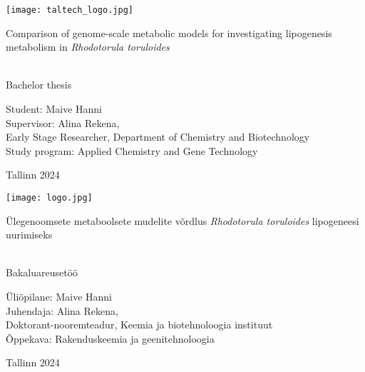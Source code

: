 \documentclass[a4paper, 11pt]{report}
\begin{document}
\begin{titlepage}
    \texttt{[image: taltech\_logo.jpg]}

    \begin{center}
        \vspace{35mm}
        \begin{LARGE}
            Comparison of genome-scale metabolic models for investigating 
            lipogenesis metabolism in \textit{Rhodotorula toruloides}
        \end{LARGE} \\
             Bachelor thesis

        \vspace{30mm}
        \hfill
        \parbox{50mm}{
            \flushleft
            Student: Maive Hanni \\
            Supervisor: Alina Rekena, \\
            Early Stage Researcher,  %
            Department of Chemistry and Biotechnology \\ %
            Study program: Applied Chemistry and Gene Technology
            }

            


        \vfill
        Tallinn 2024
    \end{center}
\end{titlepage}

\begin{titlepage}
    \texttt{[image: logo.jpg]}

    \begin{center}
        \vspace{35mm}
        \begin{LARGE}
            Ülegenoomsete metaboolsete mudelite võrdlus \textit{Rhodotorula toruloides} lipogeneesi uurimiseks
        \end{LARGE} \\
            Bakaluareusetöö

        \vspace{30mm}
        \hfill
        \parbox{50mm}{
            \flushleft
            Üliõpilane: Maive Hanni \\
            Juhendaja: Alina Rekena, \\
            Doktorant-nooremteadur, %
            Keemia ja biotehnoloogia instituut \\ %
            Õppekava: Rakenduskeemia ja geenitehnoloogia
            }

        \vfill
        Tallinn 2024
    \end{center}
\end{titlepage}
\end{document}
